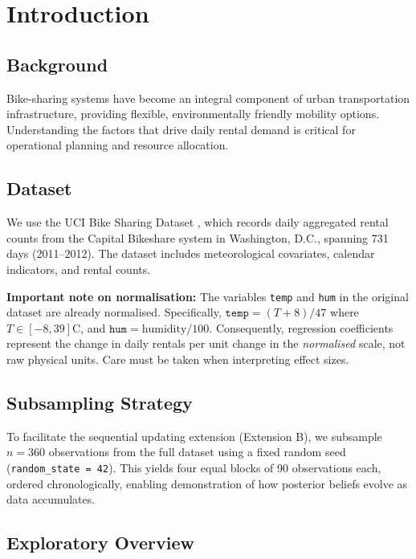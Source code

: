 \section{Introduction}\label{sec:introduction}

\subsection{Background}

Bike-sharing systems have become an integral component of urban transportation infrastructure, providing flexible, environmentally friendly mobility options. Understanding the factors that drive daily rental demand is critical for operational planning and resource allocation.

\subsection{Dataset}

We use the UCI Bike Sharing Dataset \citep{fanaee2014}, which records daily aggregated rental counts from the Capital Bikeshare system in Washington, D.C., spanning 731 days (2011--2012). The dataset includes meteorological covariates, calendar indicators, and rental counts.

\textbf{Important note on normalisation:} The variables \texttt{temp} and \texttt{hum} in the original dataset are already normalised. Specifically, $\texttt{temp} = (T + 8) / 47$ where $T \in [-8, 39]$\textdegree C, and $\texttt{hum} = \text{humidity} / 100$. Consequently, regression coefficients represent the change in daily rentals per unit change in the \emph{normalised} scale, not raw physical units. Care must be taken when interpreting effect sizes.

\subsection{Subsampling Strategy}

To facilitate the sequential updating extension (Extension B), we subsample $n = 360$ observations from the full dataset using a fixed random seed (\texttt{random\_state = 42}). This yields four equal blocks of 90 observations each, ordered chronologically, enabling demonstration of how posterior beliefs evolve as data accumulates.

\subsection{Exploratory Overview}

